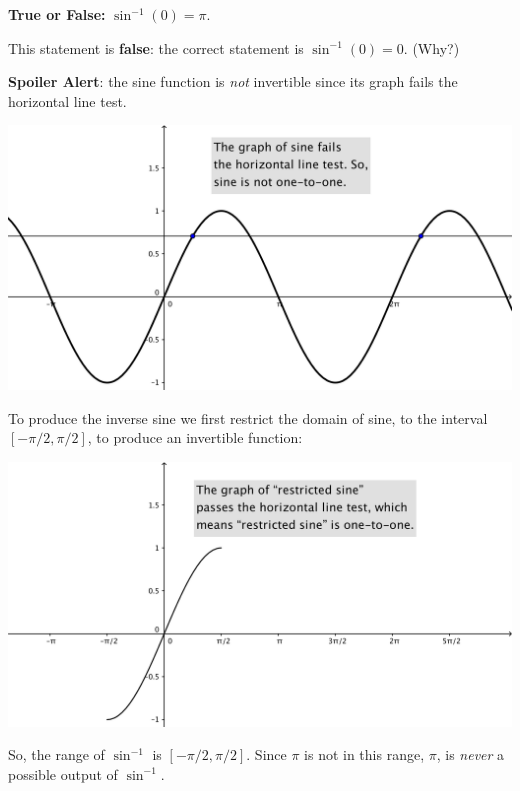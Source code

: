 \documentclass[nooutcomes,handout]{ximera}
\begin{document}
\begin{problem}

  \textbf{True or False:}
  $\sin^{-1}(0) = \pi$.
  \begin{freeResponse}
    This statement is \textbf{false}: the correct statement is $\sin^{-1}(0) = 0$. (Why?)

    \textbf{Spoiler Alert}: the sine function is \emph{not} invertible since its graph fails the horizontal line test.
    \begin{image}
      \includegraphics[scale = 0.4]{figure3.png}
    \end{image}
    To produce the inverse sine we first restrict the domain of sine, to the interval $[-\pi/2, \pi/2]$, to produce an invertible function:
    \begin{image}
      \includegraphics[scale = 0.4]{figure4.png}
    \end{image}
    So, the range of $\sin^{-1}$ is $[-\pi/2, \pi/2]$.
    Since $\pi$ is not in this range, $\pi$, is \emph{never} a possible output of $\sin^{-1}$.
  \end{freeResponse}
\end{problem}
\end{document}
